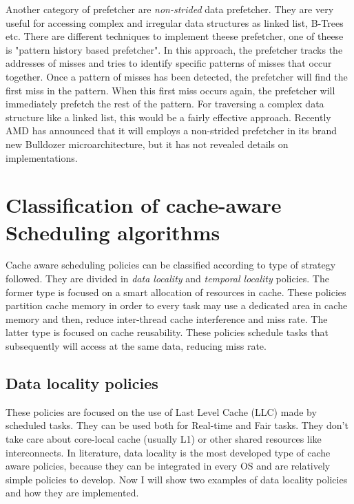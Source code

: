 Another category of prefetcher are \textit{non-strided} data prefetcher. They are very useful for accessing complex and irregular data structures as 
linked list, B-Trees etc. There are different techniques to implement theese prefetcher, one of theese is "pattern history based prefetcher". 
In this approach, the prefetcher tracks the addresses of misses and tries to identify specific patterns of misses that occur together. 
Once a pattern of misses has been detected, the prefetcher will find the first miss in the pattern. When this first miss occurs again, the prefetcher 
will immediately prefetch the rest of the pattern. For traversing a complex data structure like a linked list, this would be a fairly effective approach.
Recently AMD has announced that it will employs a non-strided prefetcher in its brand new Bulldozer microarchitecture, but it has not revealed details on 
implementations.

\section{Classification of cache-aware Scheduling algorithms}

Cache aware scheduling policies can be classified according to type of strategy followed. They are divided in \textit{data locality} and 
\textit{temporal locality} policies. The former type is focused on a smart allocation of resources in cache. These policies partition cache memory in order
to every task may use a dedicated area in cache memory and then, reduce inter-thread cache interference and miss rate.
The latter type is focused on cache reusability. These policies schedule tasks that subsequently will access at the same data, reducing miss rate.

\subsection{Data locality policies} 

These policies are focused on the use of Last Level Cache (LLC) made by scheduled tasks. They can be used both for Real-time and Fair tasks. 
They don't take care about core-local cache (usually L1) or other shared resources like interconnects. In literature, data locality is the most developed 
type of cache aware policies, because they can be integrated in every OS and are relatively simple policies to develop. Now I will show two examples of 
data locality policies and how they are implemented.


